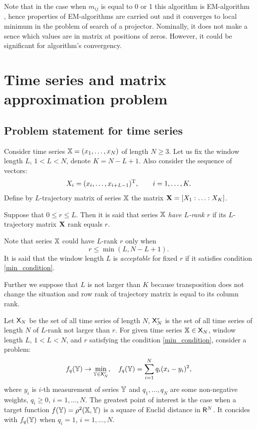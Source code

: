 \documentclass[12pt,a4paper,fleqn,leqno]{article}
\begin{document}
Note that in the case when $m_{ij}$ is equal to 0 or 1 this algorithm is EM-algorithm \cite{Srebro2003},
hence properties of EM-algorithms are carried out and it converges to local minimum in the problem of search of a projector. Nominally, it does not make a sence which values are in matrix at positions of zeros. However, it could be significant for algorithm's convergency.

\section{Time series and matrix approximation problem}
\label{sec:ts_matrices}
\subsection{Problem statement for time series}
Consider time series $\mathbb{X} = (x_1, \ldots, x_N)$ of length $N \ge 3$. Let us fix the window length $L$, $1 < L < N$, denote $K = N - L + 1$. Also consider the sequence of vectors:
\begin{equation}\label{l_lagged}
X_i = (x_i, \ldots, x_{i + L - 1})^{\mathrm{T}}, \qquad i = 1, \ldots, K.
\end{equation}
Define by $L$-trajectory matrix of series $\mathbb{X}$ the matrix $\mathbf{X} = [X_1:\ldots:X_K]$.

\begin{definition}
Suppose that $0 \le r \le L$. Then it is said that series $\mathbb{X}$ \emph{have $L$-rank $r$} if its $L$-trajectory matrix $\mathbf{X}$ rank equals $r$.
\end{definition}

Note that series $\mathbb{X}$ could have $L$-rank $r$ only when
\begin{equation}
r \le \min(L, N-L+1). \label{min_condition}
\end{equation}
It is said that the window length $L$ is \emph{acceptable} for fixed $r$ if it satisfies condition \eqref{min_condition}.

Further we suppose that $L$ is not larger than $K$ because transposition does not change the situation and row rank of trajectory matrix is equal to its column rank.

Let $\mathsf{X}_N$ be the set of all time series of length $N$, $\mathsf{X}_N^r$ is the set of all time series of length $N$ of $L$-rank not larger than $r$. For given time series $\mathbb{X} \in \mathsf{X}_N$, window length $L$, $1 < L < N$, and $r$ satisfying the condition \eqref{min_condition}, consider a problem:
\begin{equation} \label{L-rank_task}
f_q(\mathbb{Y}) \to \min_{\mathbb{Y} \in \mathsf{X}_N^r}, \quad f_q(\mathbb{Y}) = \sum \limits_{i=1}^N q_i(x_i - y_i)^2,
\end{equation}
where $y_i$ is $i$-th measurement of series $\mathbb{Y}$ and $q_1, \ldots, q_N$ are some non-negative weights,
$q_i \ge 0$, $i = 1, \ldots, N$. The greatest point of interest is the case when a target function $f(\mathbb{Y}) = \rho^2(\mathbb{X}, \mathbb{Y})$ is a square of Euclid distance in $\mathsf{R}^N$. It concides with $f_q(\mathbb{Y})$ when $q_i = 1$, $i = 1, \ldots, N$.
\end{document}
